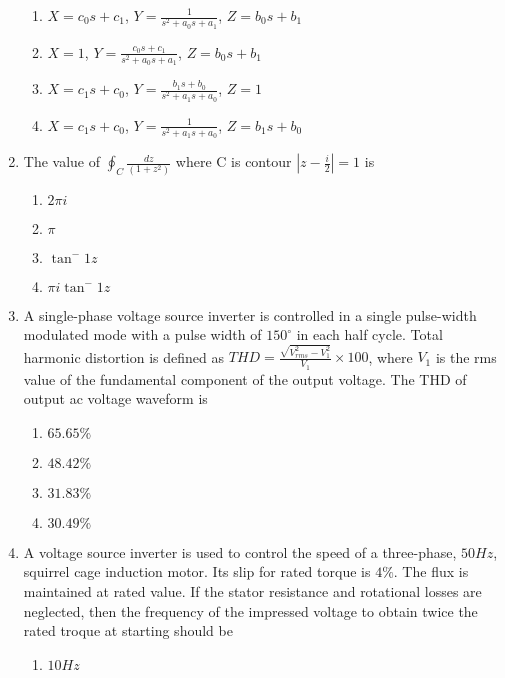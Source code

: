 \documentclass[journal]{IEEEtran}
\begin{document}
\begin{enumerate}
\begin{figure}[!ht]
\end{figure}
\begin{enumerate}
    \item $X=c_0s+c_1$, $Y=\frac{1}{s^2+a_0s+a_1}$, $Z=b_0s+b_1$
    \item $X=1$, $Y=\frac{c_0s+c_1}{s^2+a_0s+a_1}$, $Z=b_0s+b_1$
    \item $X=c_1s+c_0$, $Y=\frac{b_1s+b_0}{s^2+a_1s+a_0}$, $Z=1$
    \item $X=c_1s+c_0$, $Y=\frac{1}{s^2+a_1s+a_0}$, $Z=b_1s+b_0$
\end{enumerate}
\item The value of $\oint_{C}\frac{dz}{(1+z^{2})}$ where C is contour $|z-\frac{i}{2}|=1$ is 
\begin{multicols}{2}
\begin{enumerate}
    \item $2\pi i$
    \item $\pi$
    \item $\tan^-{1}{z}$
    \item $\pi i \tan^-{1}{z}$ 
\end{enumerate}
\end{multicols}
\item A single-phase voltage source inverter is controlled in a single pulse-width modulated mode with a pulse width of $150^\circ$ in each half cycle. Total harmonic distortion is defined as $THD=\frac{\sqrt{V_{rms}^2-V_1^2}}{V_1}\times 100$, where $V_1$ is the rms value of the fundamental component of the output voltage. The THD of output ac voltage waveform is 
\begin{multicols}{2}
\begin{enumerate}
    \item $65.65\%$
    \item $48.42\%$
    \item $31.83\%$
    \item $30.49\%$
\end{enumerate}    
\end{multicols}
\item A voltage source inverter is used to control the speed of a three-phase, $50Hz$, squirrel cage induction motor. Its slip for rated torque is $4\%$. The flux is maintained at rated value. If the stator resistance and rotational losses are neglected, then the frequency of the impressed voltage to obtain twice the rated troque at starting should be
\begin{multicols}{2}
\begin{enumerate}
    \item $10Hz$

\end{enumerate}
\end{multicols}
\end{enumerate}
\end{document}
